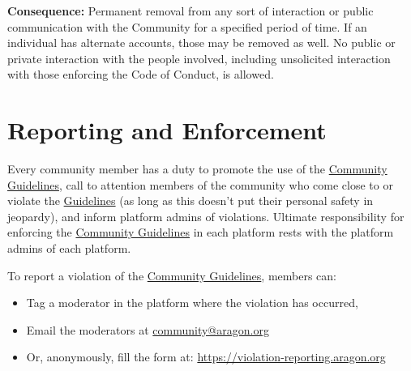 \textbf{Consequence:} Permanent removal from any sort of interaction or public communication with the Community for a specified period of time.
If an individual has alternate accounts, those may be removed as well.
No public or private interaction with the people involved, including unsolicited interaction with those enforcing the Code of Conduct, is allowed.


\section{Reporting and Enforcement}
\label{sec:ReportingAndEnforcement}
	
Every community member has a duty to promote the use of the \hyperref[chap:CommunityGuidelines]{Community Guidelines}, call to attention members of the community who come close to or violate the \hyperref[chap:CommunityGuidelines]{Guidelines} (as long as this doesn’t put their personal safety in jeopardy), and inform platform admins of violations.
Ultimate responsibility for enforcing the \hyperref[chap:CommunityGuidelines]{Community Guidelines} in each platform rests with the platform admins of each platform.
	
To report a violation of the \hyperref[chap:CommunityGuidelines]{Community Guidelines}, members can:
\begin{itemize}
	\item Tag a moderator in the platform where the violation has occurred,
	\item Email the moderators at \href{community@aragon.org}{community@aragon.org}
	\item Or, anonymously, fill the form at: \href{https://violation-reporting.aragon.org}{https://violation-reporting.aragon.org}
\end{itemize}


